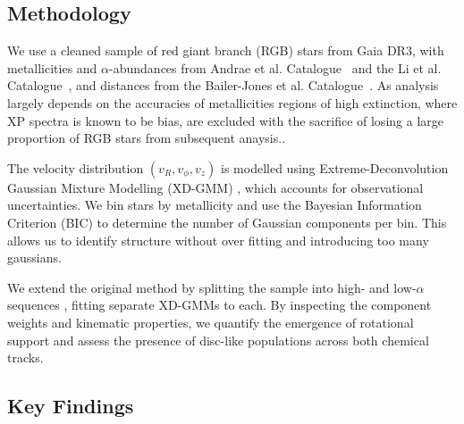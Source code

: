\documentclass[a4paper,10pt]{article}
\begin{document}
\begin{multicols}{2}
\subsection*{Methodology}

We use a cleaned sample of red giant branch (RGB) stars from Gaia DR3, with metallicities and $\alpha$-abundances from Andrae et 
al. Catalogue~\cite{Andrae2023} and the Li et al. Catalogue~\cite{Li2024}, and distances from the Bailer-Jones et al. 
Catalogue~\cite{BailerJones2021}. As analysis largely depends on the accuracies of metallicities regions of high extinction, 
where XP spectra is known to be bias, are excluded with the sacrifice of losing a large proportion of RGB stars from subsequent anaysis..

The velocity distribution $(v_R, v_\phi, v_z)$ is modelled using Extreme-Deconvolution Gaussian Mixture Modelling (XD-GMM) \cite{Bovy2011}\cite{pygmmis}, 
which accounts for observational uncertainties. We bin stars by metallicity and use the Bayesian Information Criterion (BIC) to determine the 
number of Gaussian components per bin. This allows us to identify structure without over fitting and introducing too many gaussians.


We extend the original method by splitting the sample into high- and low-$\alpha$ sequences \citep{Vis2024}, fitting separate 
XD-GMMs to each. By inspecting the component weights and kinematic properties, we quantify the emergence of rotational support 
and assess the presence of disc-like populations across both chemical tracks.

\subsection*{Key Findings}


\end{multicols}
\end{document}
